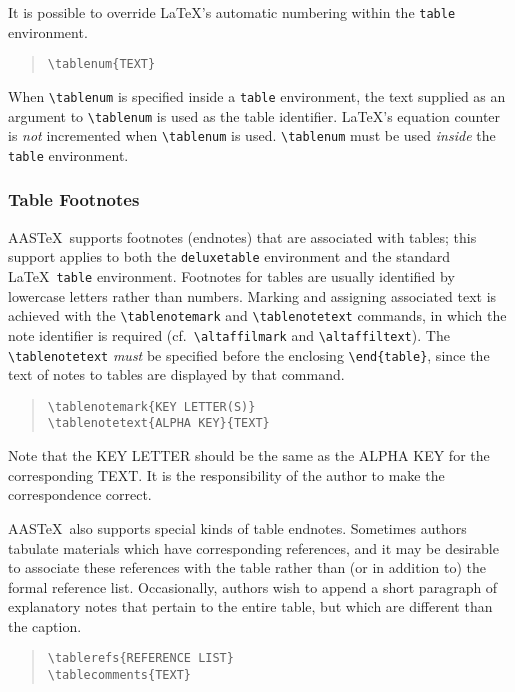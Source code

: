 It is possible to override \LaTeX's automatic numbering within the
{\tt table} environment.
\begin{quote}
\verb"\tablenum{TEXT}"
\end{quote}
When \verb"\tablenum" is specified inside a {\tt table} environment,
the text supplied as an argument to \verb"\tablenum" is used as the
table identifier.
\LaTeX's equation counter is {\sl not\/} incremented when \verb"\tablenum"
is used.
\verb"\tablenum" must be used {\sl inside\/} the {\tt table} environment.

\subsubsection{Table Footnotes}

AAS\TeX\ supports footnotes (endnotes) that are associated with tables;
this support applies to both the {\tt deluxetable} environment
and the standard \LaTeX\ {\tt table} environment.
Footnotes for tables are usually identified by lowercase letters
rather than numbers.
Marking and assigning associated text is achieved with
the \verb"\tablenotemark" and \verb"\tablenotetext"
commands, in which the note identifier is required
(cf.\ \verb"\altaffilmark" and \verb"\altaffiltext").
The \verb"\tablenotetext" {\sl must} be specified before
the enclosing \verb"\end{table}", since the text of
notes to tables are displayed by that command.
\begin{quote}
\verb"\tablenotemark{KEY LETTER(S)}"\\
\verb"\tablenotetext{ALPHA KEY}{TEXT}"
\end{quote}
Note that the {\small KEY LETTER} should be the same as the
{\small ALPHA KEY} for the corresponding {\small TEXT}.
It is the responsibility of the author to make the correspondence correct.

AAS\TeX\ also supports special kinds of table endnotes.
Sometimes authors tabulate materials which have corresponding references,
and it may be desirable to associate these references with the table
rather than (or in addition to) the formal reference list.
Occasionally, authors wish to append a short paragraph of explanatory
notes that pertain to the entire table, but which are different than
the caption.
\begin{quote}
\verb"\tablerefs{REFERENCE LIST}"\\
\verb"\tablecomments{TEXT}"
\end{quote}

